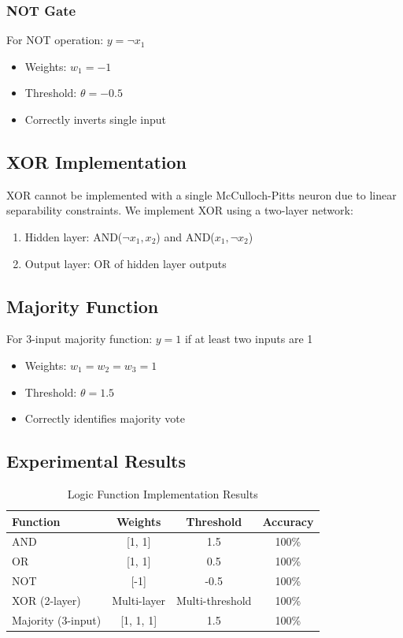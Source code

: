 \documentclass[conference]{IEEEtran}
\begin{document}
\subsubsection{NOT Gate}
For NOT operation: $y = \neg x_1$
\begin{itemize}
    \item Weights: $w_1 = -1$
    \item Threshold: $\theta = -0.5$
    \item Correctly inverts single input
\end{itemize}

\subsection{XOR Implementation}
XOR cannot be implemented with a single McCulloch-Pitts neuron due to linear separability constraints. We implement XOR using a two-layer network:
\begin{enumerate}
    \item Hidden layer: AND($\neg x_1, x_2$) and AND($x_1, \neg x_2$)
    \item Output layer: OR of hidden layer outputs
\end{enumerate}

\subsection{Majority Function}
For 3-input majority function: $y = 1$ if at least two inputs are 1
\begin{itemize}
    \item Weights: $w_1 = w_2 = w_3 = 1$
    \item Threshold: $\theta = 1.5$
    \item Correctly identifies majority vote
\end{itemize}

\subsection{Experimental Results}
\begin{table}[h]
\centering
\caption{Logic Function Implementation Results}
\begin{tabular}{l c c c}
\toprule
Function & Weights & Threshold & Accuracy \\
\midrule
AND & [1, 1] & 1.5 & 100\% \\
OR & [1, 1] & 0.5 & 100\% \\
NOT & [-1] & -0.5 & 100\% \\
XOR (2-layer) & Multi-layer & Multi-threshold & 100\% \\
Majority (3-input) & [1, 1, 1] & 1.5 & 100\% \\
\bottomrule
\end{tabular}
\label{tab:logic_results}
\end{table}
\end{document}
